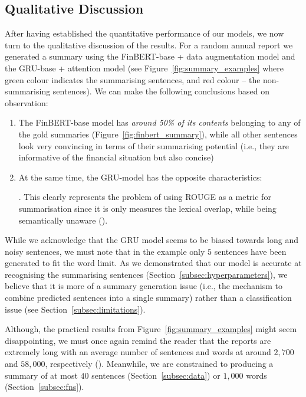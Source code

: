 \subsection{Qualitative Discussion}\label{subsec:qualitative-discussion}
After having established the quantitative performance of our models, we now turn to the qualitative discussion of the results.
For a random annual report we generated a summary using the FinBERT-base + data augmentation model and
the GRU-base + attention model (see Figure~\ref{fig:summary_examples}
where green colour indicates the summarising sentences, and red colour -- the non-summarising sentences).
We can make the following conclusions based on observation:
\begin{enumerate}
    \item The FinBERT-base model has \emph{around 50\% of its contents} belonging to any of the gold summaries (Figure~\ref{fig:finbert_summary}),
        while all other sentences look very convincing in terms of their summarising potential (i.e., they are informative of the financial situation but also concise)
    \item At the same time, the GRU-model has the opposite characteristics:
    .
    This clearly represents the problem of using ROUGE as a metric for summarisation since it is only measures the lexical overlap, while being semantically unaware (\cite{akter-etal-2022-revisiting}).
\end{enumerate}
While we acknowledge that the GRU model seems to be biased towards long and noisy sentences, we must note that in the example
only $5$ sentences have been generated to fit the word limit.
As we demonstrated that our model is accurate at recognising the summarising sentences (Section~\ref{subsec:hyperparameters}),
we believe that it is more of a summary generation issue (i.e., the mechanism to combine predicted sentences into a single summary)
rather than a classification issue (see Section~\ref{subsec:limitations}).

Although, the practical results from Figure~\ref{fig:summary_examples} might seem disappointing, we must once again remind the reader that the reports are extremely
long with an average number of sentences and words at around $2,700$ and $58,000$, respectively (\cite{litvak-vanetik-2021-summarization}).
Meanwhile, we are constrained to producing a summary of at most $40$ sentences (Section~\ref{subsec:data}) or $1,000$ words (Section~\ref{subsec:fns}).

